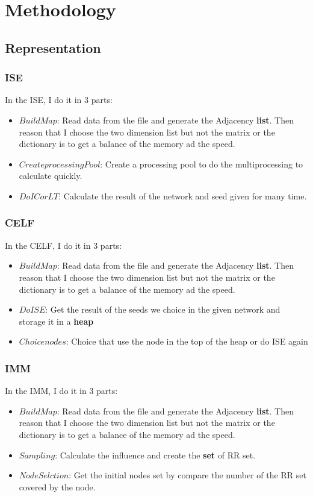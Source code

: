 \documentclass[conference,compsoc]{IEEEtran}
\begin{document}
\section{Methodology}
  \subsection{Representation}
    \subsubsection{ISE}
      In the ISE, I do it in 3 parts:
      \begin{itemize}
        \item $Build Map$: Read data from the file and generate the Adjacency \textbf{list}. Then reason that I choose the two dimension list but not the matrix or the dictionary is to get a balance of the memory ad the speed.
        \item $Create processing Pool$: Create a processing pool to do the multiprocessing to calculate quickly. 
        \item $Do IC or LT$: Calculate the result of the network and seed given for many time.
      \end{itemize}
    \subsubsection{CELF}
      In the CELF\cite{lv2014improved}\cite{goyal2011celf++}, I do it in 3 parts:
      \begin{itemize}
        \item $Build Map$: Read data from the file and generate the Adjacency \textbf{list}. Then reason that I choose the two dimension list but not the matrix or the dictionary is to get a balance of the memory ad the speed.
        \item $Do ISE$: Get the result of the seeds we choice in the given network and storage it in a \textbf{heap}
        \item $Choice nodes$: Choice that use the node in the top of the heap or do ISE again
      \end{itemize}
    \subsubsection{IMM}
      In the IMM, I do it in 3 parts:
      \begin{itemize}
        \item $Build Map$: Read data from the file and generate the Adjacency \textbf{list}. Then reason that I choose the two dimension list but not the matrix or the dictionary is to get a balance of the memory ad the speed.
        \item $Sampling$: Calculate the influence and create the \textbf{set} of RR set.
        \item $Node Selction$: Get the initial nodes set by compare the number of the RR set covered by the node.
      \end{itemize}
\end{document}
